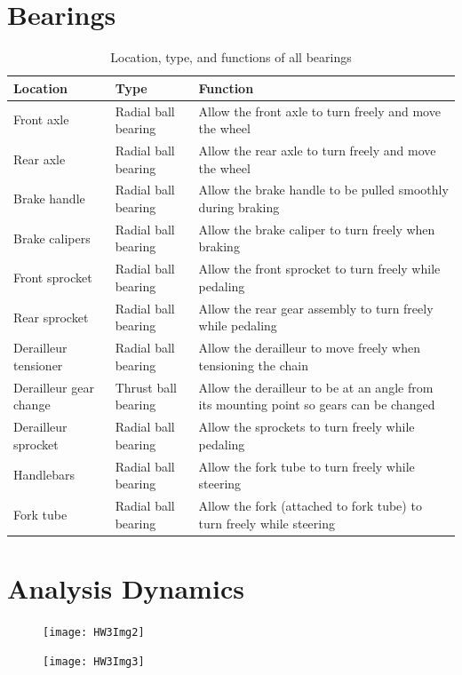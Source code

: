 \documentclass[11pt]{article}
\begin{document}
\section*{Bearings}
\begin{table}[H]
	\centering
	\begin{tabular}{|l|l|p{3.5in}|}
		\hline
		\textbf{Location} & \textbf{Type} & \textbf{Function} \\
		\hline
		Front axle & Radial ball bearing & Allow the front axle to turn freely and move the wheel \\
		\hline
		Rear axle & Radial ball bearing & Allow the rear axle to turn freely and move the wheel \\
		\hline
		Brake handle & Radial ball bearing & Allow the brake handle to be pulled smoothly during braking \\
		\hline
		Brake calipers & Radial ball bearing & Allow the brake caliper to turn freely when braking \\
		\hline
		Front sprocket & Radial ball bearing & Allow the front sprocket to turn freely while pedaling \\
		\hline
		Rear sprocket & Radial ball bearing & Allow the rear gear assembly to turn freely while pedaling \\
		\hline
		Derailleur tensioner & Radial ball bearing & Allow the derailleur to move freely when tensioning the chain \\
		\hline
		Derailleur gear change & Thrust ball bearing & Allow the derailleur to be at an angle from its mounting point so gears can be changed \\
		\hline
		Derailleur sprocket & Radial ball bearing & Allow the sprockets to turn freely while pedaling \\
		\hline
		Handlebars & Radial ball bearing & Allow the fork tube to turn freely while steering \\
		\hline
		Fork tube & Radial ball bearing & Allow the fork (attached to fork tube) to turn freely while steering \\
		\hline
	\end{tabular}
	\caption{Location, type, and functions of all bearings}
\end{table}

\section*{Analysis Dynamics}
\begin{figure}[H]
	\centering
	\texttt{[image: HW3Img2]}
\end{figure}
\begin{figure}[H]
	\centering
	\texttt{[image: HW3Img3]}
\end{figure}
\end{document}
